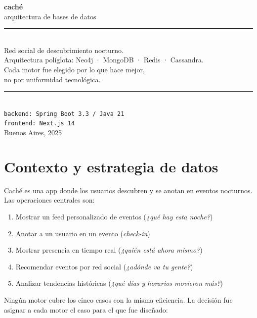 \documentclass[12pt, a4paper]{article}
\begin{document}
\begin{titlepage}
  \centering
  \vspace*{3cm}
  {\Huge\bfseries caché}\\[0.5em]
  {\large arquitectura de bases de datos}\\[2em]
  \rule{0.6\textwidth}{0.5pt}\\[2em]
  {\normalsize
    Red social de descubrimiento nocturno.\\
    Arquitectura políglota: Neo4j · MongoDB · Redis · Cassandra.\\[1em]
    Cada motor fue elegido por lo que hace mejor,\\
    no por uniformidad tecnológica.
  }\\[3em]
  \rule{0.6\textwidth}{0.5pt}\\[2em]
  {\small\texttt{backend: Spring Boot 3.3 / Java 21}}\\
  {\small\texttt{frontend: Next.js 14}}\\[2em]
  {\footnotesize Buenos Aires, 2025}
\end{titlepage}

\tableofcontents
\newpage

\section{Contexto y estrategia de datos}

Caché es una app donde los usuarios descubren y se anotan en eventos nocturnos.
Las operaciones centrales son:

\begin{enumerate}[nosep]
  \item Mostrar un feed personalizado de eventos (\emph{¿qué hay esta noche?})
  \item Anotar a un usuario en un evento (\emph{check-in})
  \item Mostrar presencia en tiempo real (\emph{¿quién está ahora mismo?})
  \item Recomendar eventos por red social (\emph{¿adónde va tu gente?})
  \item Analizar tendencias históricas (\emph{¿qué días y horarios movieron más?})
\end{enumerate}

Ningún motor cubre los cinco casos con la misma eficiencia.
La decisión fue asignar a cada motor el caso para el que fue diseñado:
\end{document}
